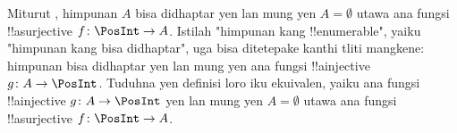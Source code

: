 \documentclass[../../../include/open-logic-section]{subfiles}
\begin{document}
\begin{prob}
  Miturut , himpunan $A$
  bisa didhaptar yen lan mung yen $A = \emptyset$ utawa ana fungsi !!a{surjective} $f\colon
  \PosInt \to A$. Istilah "himpunan kang !!{enumerable}", yaiku
  "himpunan kang bisa didhaptar", uga bisa ditetepake kanthi tliti mangkene:
  himpunan bisa didhaptar yen lan mung yen ana fungsi !!a{injective}
  $g\colon A \to \PosInt$. Tuduhna yen definisi loro iku
  ekuivalen, yaiku ana fungsi !!a{injective}
  $g\colon A \to \PosInt$ yen lan mung yen $A = \emptyset$ utawa ana
  fungsi !!a{surjective} $f\colon \PosInt \to A$.
\end{prob}
\end{document}
